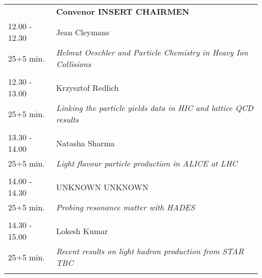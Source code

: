 \begin{longtable}{p{3cm}p{13cm}}
&\hfill {\bf Convenor INSERT CHAIRMEN }\\ 
12.00 - 12.30 & Jean Cleymans\\ 
25+5 min. & {\it Helmut Oeschler and Particle Chemistry in Heavy Ion Collisions}\\ 
 & \\ 
12.30 - 13.00 & Krzysztof Redlich\\ 
25+5 min. & {\it Linking the particle yields data in HIC and lattice QCD results}\\ 
 & \\ 
13.30 - 14.00 & Natasha Sharma\\ 
25+5 min. & {\it Light flavour particle production in ALICE at LHC}\\ 
 & \\ 
14.00 - 14.30 & UNKNOWN UNKNOWN\\ 
25+5 min. & {\it Probing resonance matter with HADES}\\ 
 & \\ 
14.30 - 15.00 & Lokesh Kumar\\ 
25+5 min. & {\it Recent results on light hadron production from STAR TBC}\\ 
 & \\ 
\end{longtable}

